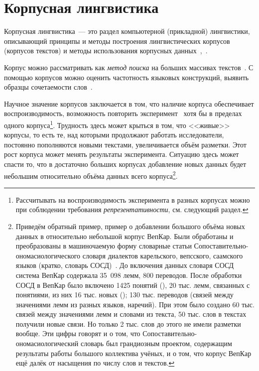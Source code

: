 \section{Корпусная лингвистика}\label{sect_review_corpus_linguistics}

Корпусная лингвистика~--- это раздел компьютерной (прикладной) лингвистики, 
описывающий принципы и методы 
построения лингвистических корпусов (корпусов текстов)
и методы использования корпусных данных~\cite[3]{Zakharov2005},~\cite[407]{Kibrik2019}.


Корпус можно рассматривать как \emph{метод поиска} 
на больших массивах текстов~\cite[18]{Kozera2019CorpusAsMethod}. 
С помощью корпусов можно оценить частотность языковых конструкций, 
выявить образцы сочетаемости слов~\cite[18]{Kozera2019CorpusAsMethod}. 


Научное значение корпусов заключается в том, что наличие корпуса обеспечивает воспроизводимость, 
возможность повторить эксперимент~\cite[409]{Kibrik2019} 
хотя бы в пределах одного корпуса\footnote{%
    Рассчитывать на воспроизводимость эксперимента в разных корпусах можно 
    при соблюдении требования \emph{репрезентативности}, см. следующий раздел.
}. 
Трудность здесь может крыться в том, что <<живые>> корпусы, 
то есть те, над которыми продолжают работать исследователи, 
постоянно пополняются новыми текстами, увеличивается объём разметки. 
Этот рост корпуса может менять результаты эксперимента. 
Ситуацию здесь может спасти то, 
что в достаточно больших корпусах добавление новых данных будет небольшим 
относительно объёма данных всего корпуса\footnote{%
    Приведём обратный пример, пример о добавлении большого объёма новых данных 
    в относительно небольшой корпус ВепКар. 
    Были обработаны и преобразованы в машиночаемую форму словарные статьи 
    Сопоставительно-ономасиологического словаря диалектов карельского, вепсского, саамского языков (кратко, словарь СОСД)~\cite{SOSD2007}. 
    До включения данных словаря СОСД система ВепКар содержала 35~098 лемм, 800 переводов.
    После обработки СОСД в ВепКар было включено 1425 понятий 
        (), 
    20 тыс. лемм, связанных с понятиями, из них 16 тыс. новых (); 
    130 тыс. переводов (связей между значениями лемм из разных языков, наречий). 
    При этом было создано 60 тыс. связей между значениями лемм и словами из текста, 
    50 тыс. слов в текстах получили новые связи. Но только 2 тыс. слов до этого не имели разметки вообще.
    Эти цифры говорят и о том, что Сопоставительно-ономасиологический словарь был грандиозным проектом, 
    содержащим результаты работы большого коллектива учёных, и о том,
    что корпус ВепКар ещё далёк от насыщения по числу слов и текстов.
}.


